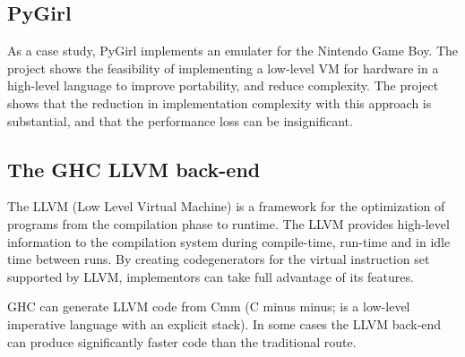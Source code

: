 \subsection{PyGirl}

As a case study, PyGirl implements an emulater for the Nintendo Game Boy. The project 
shows the feasibility of implementing a low-level VM for hardware in a high-level 
language to improve portability, and reduce complexity. The project shows that the
reduction in implementation complexity with this approach is substantial, 
and that the performance loss can be insignificant.
\cite{bruni2009pygirl}

\subsection{The GHC LLVM back-end}

The LLVM (Low Level Virtual Machine) is a framework for the optimization of 
programs from the compilation phase to runtime. The LLVM provides high-level information 
to the compilation system during compile-time, run-time and in idle time between
runs. By creating codegenerators for the virtual instruction set supported by
LLVM, implementors can take full advantage of its features.
\cite{lattner2004llvm}

GHC can generate LLVM code from Cmm (C minus minus; is a low-level imperative
language with an explicit stack). In some cases the 
LLVM back-end can produce significantly faster code than the traditional route. 
\cite{marlow2012glasgow, terei2010llvm}

